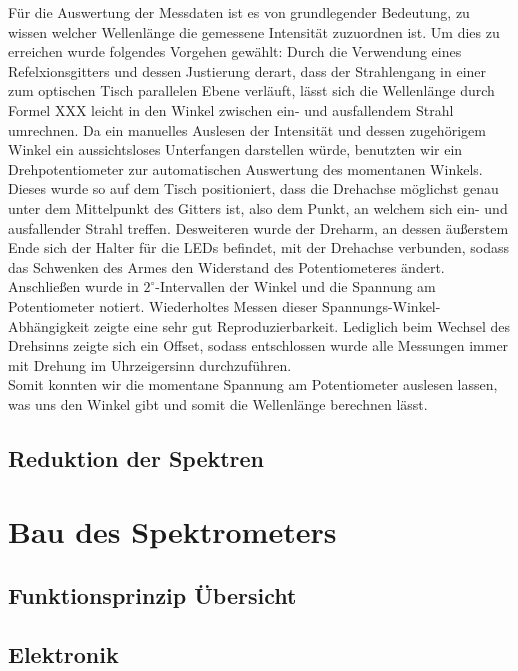 \documentclass[11pt]{scrartcl}
\begin{document}
Für die Auswertung der Messdaten ist es von grundlegender Bedeutung, zu wissen welcher Wellenlänge die gemessene Intensität zuzuordnen ist. Um dies zu erreichen wurde folgendes Vorgehen gewählt: Durch die Verwendung eines Refelxionsgitters und dessen Justierung derart, dass der Strahlengang in einer zum optischen Tisch parallelen Ebene verläuft, lässt sich die Wellenlänge durch Formel XXX leicht in den Winkel zwischen ein- und ausfallendem Strahl umrechnen. Da ein manuelles Auslesen der Intensität und dessen zugehörigem Winkel ein aussichtsloses Unterfangen darstellen würde, benutzten wir ein Drehpotentiometer zur automatischen Auswertung des momentanen Winkels. Dieses wurde so auf dem Tisch positioniert, dass die Drehachse möglichst genau unter dem Mittelpunkt des Gitters ist, also dem Punkt, an welchem sich ein- und ausfallender Strahl treffen. Desweiteren wurde der Dreharm, an dessen äußerstem Ende sich der Halter für die LEDs befindet, mit der Drehachse verbunden, sodass das Schwenken des Armes den Widerstand des Potentiometeres ändert. Anschließen wurde in $2^\circ$-Intervallen der Winkel und die Spannung am Potentiometer notiert. Wiederholtes Messen dieser Spannungs-Winkel-Abhängigkeit zeigte eine sehr gut Reproduzierbarkeit. Lediglich beim Wechsel des Drehsinns zeigte sich ein Offset, sodass entschlossen wurde alle Messungen immer mit Drehung im Uhrzeigersinn durchzuführen.\\
Somit konnten wir die momentane Spannung am Potentiometer auslesen lassen, was uns den Winkel gibt und somit die Wellenlänge berechnen lässt.


\subsection{Reduktion der Spektren}





\section{Bau des Spektrometers}
\subsection{Funktionsprinzip Übersicht}

\subsection{Elektronik}
\end{document}

